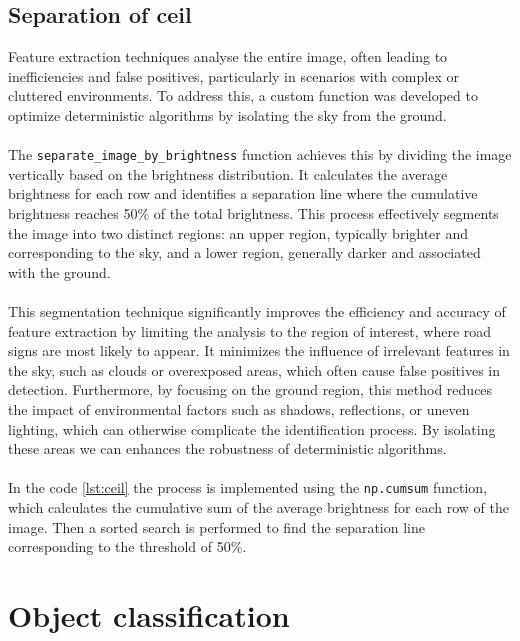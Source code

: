 \documentclass[10pt,conference,a4paper]{IEEEtran}
\begin{document}
\subsection{Separation of ceil}\label{sec:ceil}
Feature extraction techniques analyse the entire image, often leading to inefficiencies and false positives, particularly in scenarios with complex or cluttered environments. To address this, a custom function was developed to optimize deterministic algorithms by isolating the sky from the ground.\\\\
The \texttt{separate\_image\_by\_brightness} function achieves this by dividing the image vertically based on the brightness distribution. It calculates the average brightness for each row and identifies a separation line where the cumulative brightness reaches 50\% of the total brightness. This process effectively segments the image into two distinct regions: an upper region, typically brighter and corresponding to the sky, and a lower region, generally darker and associated with the ground.\\\\
This segmentation technique significantly improves the efficiency and accuracy of feature extraction by limiting the analysis to the region of interest, where road signs are most likely to appear. It minimizes the influence of irrelevant features in the sky, such as clouds or overexposed areas, which often cause false positives in detection. Furthermore, by focusing on the ground region, this method reduces the impact of environmental factors such as shadows, reflections, or uneven lighting, which can otherwise complicate the identification process. By isolating these areas we can enhances the robustness of deterministic algorithms.\\\\
In the code \ref{lst:ceil} the process is implemented using the \texttt{np.cumsum} function, which calculates the cumulative sum of the average brightness for each row of the image. Then a sorted search is performed to find the separation line corresponding to the threshold of 50\%.
\section{Object classification}
\end{document}
